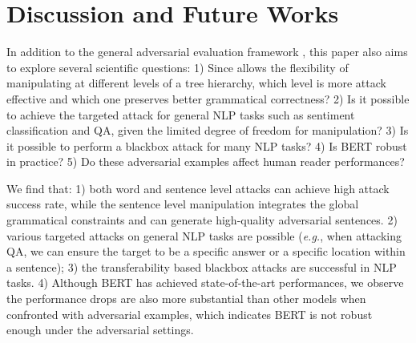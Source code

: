 
\section{Discussion and Future Works}
In addition to the general adversarial evaluation framework \advcodec, this paper also aims to explore several scientific questions: 1)  Since \advcodec allows the flexibility of manipulating at different levels of a tree hierarchy, which level is more attack effective and which one preserves better grammatical correctness? 2) Is it possible to achieve the targeted attack for general NLP tasks such as sentiment classification and QA, given the limited degree of freedom for manipulation? 3) Is it possible to perform a blackbox attack for many  NLP tasks? 4) Is BERT robust in practice? 
5) Do these adversarial examples affect human reader performances? 


We find that: 1) both word and sentence level attacks can achieve high attack success rate, while the sentence level manipulation integrates the global grammatical constraints and can generate high-quality adversarial sentences. 2) various targeted attacks on general NLP tasks are possible (\textit{e.g.}, when attacking QA, we can ensure  the target to be a specific answer or a specific location within a sentence); 3) the transferability based blackbox attacks are successful in NLP tasks. 
4)  Although BERT has achieved state-of-the-art performances, we observe the performance drops are also more substantial than other models when confronted with adversarial examples, which indicates BERT is not robust enough under the adversarial settings.

